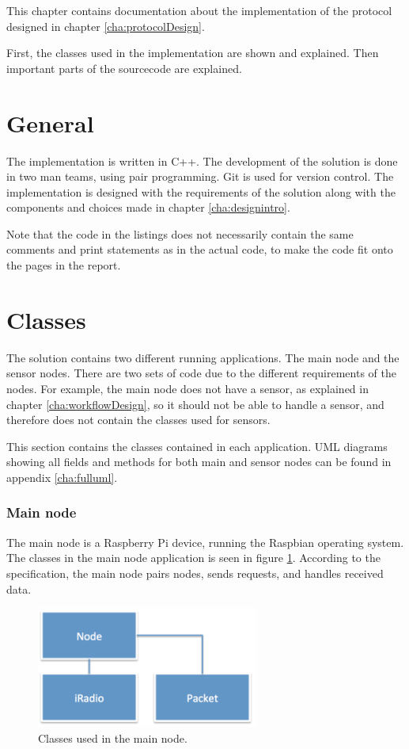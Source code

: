 This chapter contains documentation about the implementation of the protocol designed in chapter \ref{cha:protocolDesign}. 

First, the classes used in the implementation are shown and explained. Then important parts of the sourcecode are explained.
 

\section{General}
The implementation is written in C++. The development of the solution is done in two man teams, using pair programming. Git is used for version control. The implementation is designed with the requirements of the solution along with the components and choices made in chapter \ref{cha:designintro}. 

Note that the code in the listings does not necessarily contain the same comments and print statements as in the actual code, to make the code fit onto the pages in the report.

\section{Classes}
The solution contains two different running applications. The main node and the sensor nodes. There are two sets of code due to the different requirements of the nodes. For example, the main node does not have a sensor, as explained in chapter \ref{cha:workflowDesign}, so it should not be able to handle a sensor, and therefore does not contain the classes used for sensors.

This section contains the classes contained in each application. UML diagrams showing all fields and methods for both main and sensor nodes can be found in appendix \ref{cha:fulluml}.

\subsubsection*{Main node}
The main node is a Raspberry Pi device, running the Raspbian operating system. The classes in the main node application is seen in figure \ref{fig:mainnodeClass}. 
According to the specification, the main node pairs nodes, sends requests, and handles received data.

\begin{figure}[h!]
\centering
\includegraphics[width=0.65\textwidth]{chapters/implementation/figures/mainnodeClass.png}
\caption{Classes used in the main node.}
\label{fig:mainnodeClass}
\end{figure}



